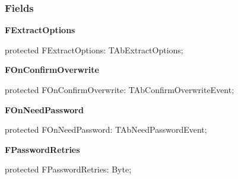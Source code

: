 \documentclass{report}
\newif\ifpdf
\begin{document}
\subsubsection*{\large{\textbf{Fields}}\normalsize\hspace{1ex}\hfill}
\begin{list}{}{
\setlength{\itemindent}{0cm}
\setlength{\listparindent}{0cm}
\setlength{\leftmargin}{\evensidemargin}
\addtolength{\leftmargin}{\tmplength}
\settowidth{\labelsep}{X}
\addtolength{\leftmargin}{\labelsep}
\setlength{\labelwidth}{\tmplength}
}
\label{AbUnzper.TAbCustomUnZipper-FExtractOptions}
\item[\textbf{FExtractOptions}\hfill]
\ifpdf
\begin{flushleft}
\fi
\begin{ttfamily}
protected FExtractOptions: TAbExtractOptions;\end{ttfamily}

\ifpdf
\end{flushleft}
\fi


\par  \label{AbUnzper.TAbCustomUnZipper-FOnConfirmOverwrite}
\item[\textbf{FOnConfirmOverwrite}\hfill]
\ifpdf
\begin{flushleft}
\fi
\begin{ttfamily}
protected FOnConfirmOverwrite: TAbConfirmOverwriteEvent;\end{ttfamily}

\ifpdf
\end{flushleft}
\fi


\par  \label{AbUnzper.TAbCustomUnZipper-FOnNeedPassword}
\item[\textbf{FOnNeedPassword}\hfill]
\ifpdf
\begin{flushleft}
\fi
\begin{ttfamily}
protected FOnNeedPassword: TAbNeedPasswordEvent;\end{ttfamily}

\ifpdf
\end{flushleft}
\fi


\par  \label{AbUnzper.TAbCustomUnZipper-FPasswordRetries}
\item[\textbf{FPasswordRetries}\hfill]
\ifpdf
\begin{flushleft}
\fi
\begin{ttfamily}
protected FPasswordRetries: Byte;\end{ttfamily}

\ifpdf
\end{flushleft}
\fi


\par  \end{list}
\end{document}
